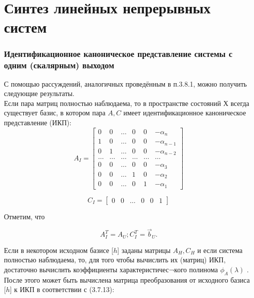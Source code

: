 \chapter{Синтез линейных непрерывных систем}
\setcounter{section}{8} %
\setcounter{subsection}{2} %
\setcounter{equation}{23} %
\subsection{Идентификационное каноническое представление системы с одним (скалярным) выходом}
С помощью рассуждений, аналогичных проведённым в п.3.8.1, можно получить следующие результаты.\\
Если пара матриц    полностью наблюдаема,  то  в   пространстве состояний  Х  всегда существует базис, в котором пара ${A,C}$  имеет идентификационное каноническое представление (ИКП):
\begin{equation}
	A_I = 
	\begin{bmatrix}
	    0 & 0 & \dots & 0 & 0 & -\alpha_n \\
	    1 & 0 & \dots & 0 & 0 & -\alpha_{n-1} \\
	    0 & 1 & \dots & 0 & 0 & -\alpha_{n-2} \\
	    \dots & \dots & \dots & \dots & \dots & \dots \\
	    0 & 0 & \dots & 0 & 0 & -\alpha_3 \\
	    0 & 0 & \dots & 1 & 0 & -\alpha_2 \\
	    0 & 0 & \dots & 0 & 1 & -\alpha_1
	\end{bmatrix}
\end{equation}

\begin{equation}
	C_I = 
	\begin{bmatrix}
	    0 & 0 & \dots & 0 & 0 & 1
	\end{bmatrix}
\end{equation}

Отметим, что

\begin{equation}
	A_I^T = A_U; C_I^T=\vec{b}_U.
\end{equation}

Если   в  некотором  исходном  базисе [$h$] заданы матрицы $A_H, C_H$ и если система полностью наблюдаема, то, для того чтобы вычислить их (матриц) ИКП, достаточно вычислить коэффициенты характеристичес¬кого полинома $\phi_A(\lambda)$ . После этого может быть вычислена матрица преобразования от исходного базиса [$h$] к ИКП в соответствии с (3.7.13):

